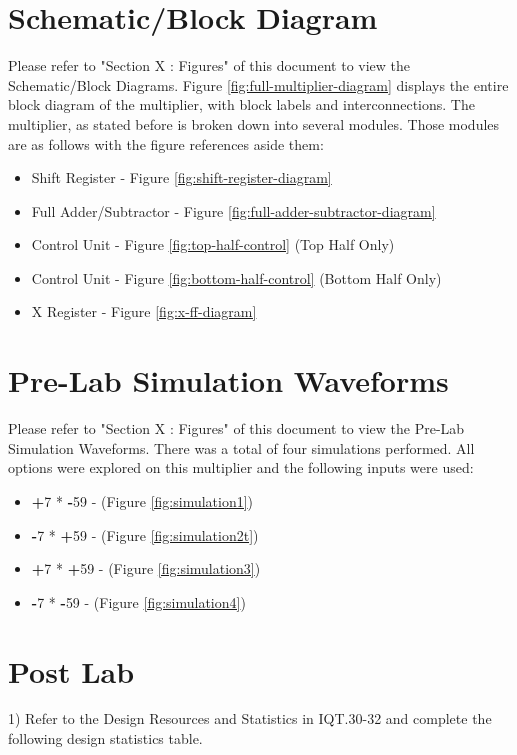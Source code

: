 \documentclass[journal, twocolumn, final,11pt,letterpaper]{IEEEtran}
\begin{document}
\section{Schematic/Block Diagram}
Please refer to "Section X : Figures" of this document to view the Schematic/Block Diagrams. Figure \ref{fig:full-multiplier-diagram} displays the entire block diagram of the multiplier, with block labels and interconnections. The multiplier, as stated before is broken down into several modules. Those modules are as follows with the figure references aside them:
\begin{itemize}
	\item Shift Register - Figure \ref{fig:shift-register-diagram}
	\item Full Adder/Subtractor - Figure \ref{fig:full-adder-subtractor-diagram}
	\item Control Unit - Figure \ref{fig:top-half-control} (Top Half Only)
	\item Control Unit - Figure \ref{fig:bottom-half-control} (Bottom Half Only)
	\item X Register - Figure \ref{fig:x-ff-diagram}
\end{itemize}

\section{Pre-Lab Simulation Waveforms}
Please refer to "Section X : Figures" of this document to view the Pre-Lab Simulation Waveforms. There was a total of four simulations performed. All options were explored on this multiplier and the following inputs were used: 
\begin{itemize}
	\item \textbf{+}7 * \textbf{-}59 - (Figure \ref{fig:simulation1})
	\item \textbf{-}7 * \textbf{+}59 - (Figure \ref{fig:simulation2t})
	\item \textbf{+}7 * \textbf{+}59 - (Figure \ref{fig:simulation3})
	\item \textbf{-}7 * \textbf{-}59  - (Figure \ref{fig:simulation4})
\end{itemize}
\section{Post Lab}
1)  Refer to the Design Resources and Statistics in IQT.30-32 and complete
the following design statistics table.\\
\end{document}
